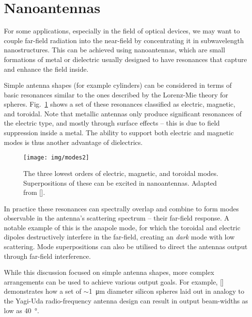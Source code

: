 \documentclass[12pt,a4paper]{article}
\newcommand{\citein}[1]{[\citen{#1}]}
\begin{document}
\section{Nanoantennas}
For some applications, especially in the field of optical devices, %
we may want to couple far-field radiation into the near-field by concentrating it in subwavelength nanostructures. This can be achieved using nanoantennas, which are small formations of metal or dielectric usually designed to have resonances that capture and enhance the field inside\cite{krasnokAlldielectricOpticalNanoantennas2012}.

Simple antenna shapes (for example cylinders) can be considered in terms of basic resonances similar to the ones described by the Lorenz-Mie theory for spheres\cite{sainNonlinearOpticsAlldielectric2019}. Fig.~\ref{fig:modes2} shows a set of these resonances classified as electric, magnetic, and toroidal. Note that metallic antennas only produce significant resonances of the electric type, and mostly through surface effects\cite{kuznetsovOpticallyResonantDielectric2016} -- this is due to field suppression inside a metal. The ability to support both electric and magnetic modes is thus another advantage of dielectrics.
\begin{figure}[h]
	\centering
	\texttt{[image: img/modes2]}
	\caption{The three lowest orders of electric, magnetic, and toroidal modes. Superpositions of these can be excited in nanoantennas. Adapted from \citein{savinovToroidalDipolarExcitation2014}.}
	\label{fig:modes2}
\end{figure}

In practice these resonances can spectrally overlap and combine to form modes observable in the antenna's scattering spectrum -- their far-field response. A notable example of this is the anapole mode, for which the toroidal and electric dipoles destructively interfere in the far-field, creating an \emph{dark} mode with low scattering\cite{grinblatEnhancedThirdHarmonic2016}. Mode superpositions can also be utilised to direct the antennas output through far-field interference.

While this discussion focused on simple antenna shapes, more complex arrangements can be used to achieve various output goals. For example, \citein{krasnokAlldielectricOpticalNanoantennas2012} demonstrates how a set of $\sim$\SI{1}{\micro\meter} diameter silicon spheres laid out in analogy to the Yagi-Uda radio-frequency antenna design can result in output beam-widths as low as \SI{40}{\degree}.
\end{document}
